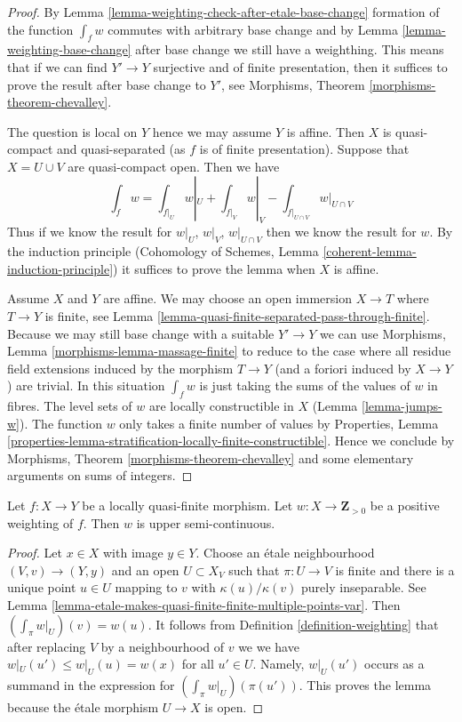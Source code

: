 \begin{proof}
By Lemma \ref{lemma-weighting-check-after-etale-base-change}
formation of the function $\int_f w$ commutes with arbitrary
base change and by Lemma \ref{lemma-weighting-base-change}
after base change we still have a weighthing.
This means that if we can find $Y' \to Y$
surjective and of finite presentation, then it
suffices to prove the result after base change to $Y'$, see
Morphisms, Theorem \ref{morphisms-theorem-chevalley}.

\medskip\noindent
The question is local on $Y$ hence we may assume $Y$ is affine.
Then $X$ is quasi-compact and quasi-separated
(as $f$ is of finite presentation). Suppose that $X = U \cup V$
are quasi-compact open. Then we have
$$
\textstyle{\int}_f w =
\textstyle{\int}_{f|_U} w|_U +
\textstyle{\int}_{f|_V} w|_V -
\textstyle{\int}_{f|_{U \cap V}} w|_{U \cap V}
$$
Thus if we know the result for $w|_U$, $w|_V$, $w|_{U \cap V}$
then we know the result for $w$. By the induction principle
(Cohomology of Schemes, Lemma \ref{coherent-lemma-induction-principle})
it suffices to prove the lemma when $X$ is affine.

\medskip\noindent
Assume $X$ and $Y$ are affine. We may choose an open immersion
$X \to T$ where $T \to Y$ is finite, see
Lemma \ref{lemma-quasi-finite-separated-pass-through-finite}.
Because we may still base change with a suitable $Y' \to Y$
we can use Morphisms, Lemma \ref{morphisms-lemma-massage-finite}
to reduce to the case where
all residue field extensions induced by the morphism $T \to Y$
(and a foriori induced by $X \to Y$) are trivial.
In this situation $\int_f w$ is just taking the sums
of the values of $w$ in fibres. The level sets of $w$
are locally constructible in $X$ (Lemma \ref{lemma-jumps-w}).
The function $w$ only takes a finite number of values by
Properties, Lemma
\ref{properties-lemma-stratification-locally-finite-constructible}.
Hence we conclude by
Morphisms, Theorem \ref{morphisms-theorem-chevalley}
and some elementary arguments on sums of integers.
\end{proof}

\begin{lemma}
\label{lemma-semicontinuous-w}
Let $f : X \to Y$ be a locally quasi-finite morphism.
Let $w : X \to \mathbf{Z}_{> 0}$ be a positive weighting of $f$.
Then $w$ is upper semi-continuous.
\end{lemma}

\begin{proof}
Let $x \in X$ with image $y \in Y$. Choose an \'etale neighbourhood
$(V, v) \to (Y, y)$ and an open $U \subset X_V$ such that
$\pi : U \to V$ is finite and there is a unique point $u \in U$
mapping to $v$ with $\kappa(u)/\kappa(v)$ purely inseparable.
See Lemma \ref{lemma-etale-makes-quasi-finite-finite-multiple-points-var}.
Then $(\int_\pi w|_U)(v) = w(u)$.
It follows from Definition \ref{definition-weighting}
that after replacing $V$ by a neighbourhood of $v$ we
we have $w|_U(u') \leq w|_U(u) = w(x)$ for all $u' \in U$.
Namely, $w|_U(u')$ occurs as a summand in the expression
for $(\int_\pi w|_U)(\pi(u'))$.
This proves the lemma because the \'etale morphism
$U \to X$ is open.
\end{proof}

